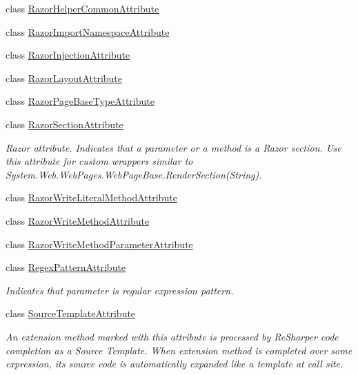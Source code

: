 \begin{DoxyCompactItemize}
class \mbox{\hyperlink{class_r_f_storage_1_1_razor_helper_common_attribute}{Razor\+Helper\+Common\+Attribute}}
\item 
class \mbox{\hyperlink{class_r_f_storage_1_1_razor_import_namespace_attribute}{Razor\+Import\+Namespace\+Attribute}}
\item 
class \mbox{\hyperlink{class_r_f_storage_1_1_razor_injection_attribute}{Razor\+Injection\+Attribute}}
\item 
class \mbox{\hyperlink{class_r_f_storage_1_1_razor_layout_attribute}{Razor\+Layout\+Attribute}}
\item 
class \mbox{\hyperlink{class_r_f_storage_1_1_razor_page_base_type_attribute}{Razor\+Page\+Base\+Type\+Attribute}}
\item 
class \mbox{\hyperlink{class_r_f_storage_1_1_razor_section_attribute}{Razor\+Section\+Attribute}}
\begin{DoxyCompactList}\small\item\em Razor attribute. Indicates that a parameter or a method is a Razor section. Use this attribute for custom wrappers similar to {\ttfamily System.\+Web.\+Web\+Pages.\+Web\+Page\+Base.\+Render\+Section(\+String)}. \end{DoxyCompactList}\item 
class \mbox{\hyperlink{class_r_f_storage_1_1_razor_write_literal_method_attribute}{Razor\+Write\+Literal\+Method\+Attribute}}
\item 
class \mbox{\hyperlink{class_r_f_storage_1_1_razor_write_method_attribute}{Razor\+Write\+Method\+Attribute}}
\item 
class \mbox{\hyperlink{class_r_f_storage_1_1_razor_write_method_parameter_attribute}{Razor\+Write\+Method\+Parameter\+Attribute}}
\item 
class \mbox{\hyperlink{class_r_f_storage_1_1_regex_pattern_attribute}{Regex\+Pattern\+Attribute}}
\begin{DoxyCompactList}\small\item\em Indicates that parameter is regular expression pattern. \end{DoxyCompactList}\item 
class \mbox{\hyperlink{class_r_f_storage_1_1_source_template_attribute}{Source\+Template\+Attribute}}
\begin{DoxyCompactList}\small\item\em An extension method marked with this attribute is processed by Re\+Sharper code completion as a \textquotesingle{}Source Template\textquotesingle{}. When extension method is completed over some expression, it\textquotesingle{}s source code is automatically expanded like a template at call site. \end{DoxyCompactList}\item 

\end{DoxyCompactItemize}
